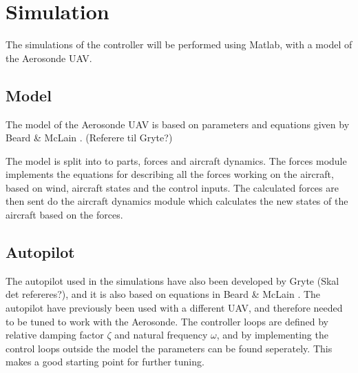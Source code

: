\section{Simulation}
\label{ch:simulation}

The simulations of the controller will be performed using Matlab, with a model of the Aerosonde UAV. 

\subsection{Model}

The model of the Aerosonde UAV is based on parameters and equations given by Beard \& McLain \cite{suaBEARD}. (Referere til Gryte?)

The model is split into to parts, forces and aircraft dynamics. The forces module implements the equations for describing all the forces working on the aircraft, based on wind, aircraft states and the control inputs. The calculated forces are then sent do the aircraft dynamics module which calculates the new states of the aircraft based on the forces.


\subsection{Autopilot}

The autopilot used in the simulations have also been developed by Gryte (Skal det refereres?), and it is also based on equations in Beard \& McLain \cite{suaBEARD}. The autopilot have previously been used with a different UAV, and therefore needed to be tuned to work with the Aerosonde. The controller loops are defined by relative damping factor $\zeta$ and natural frequency $\omega$, and by implementing the control loops outside the model the parameters can be found seperately. This makes a good starting point for further tuning.